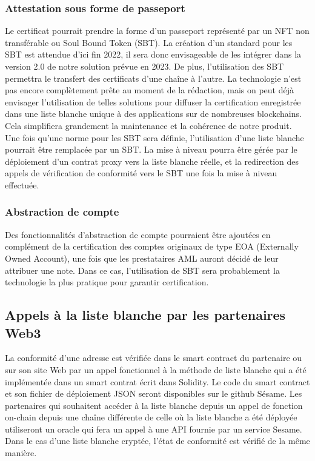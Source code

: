 ﻿\documentclass[a4paper]{article}
\begin{document}
\subsubsection{Attestation sous forme de passeport}
Le certificat pourrait prendre la forme d'un passeport représenté par un NFT non transférable ou Soul Bound Token (SBT). La création d'un standard pour les SBT est attendue d’ici fin 2022, il sera donc envisageable de les intégrer dans la version 2.0 de notre solution prévue en 2023.
De plus, l’utilisation des SBT permettra le transfert des certificats d'une chaîne à l'autre. La technologie n'est pas encore complètement prête au moment de la rédaction, mais on peut déjà envisager l'utilisation de telles solutions pour diffuser la certification enregistrée dans une liste blanche unique à des applications sur de nombreuses blockchains. Cela simplifiera grandement la maintenance et la cohérence de notre produit. \\

Une fois qu'une norme pour les SBT sera définie, l'utilisation d'une liste blanche pourrait être remplacée par un SBT. La mise à niveau pourra être gérée par le déploiement d'un contrat proxy vers la liste blanche réelle, et la redirection des appels de vérification de conformité vers le SBT une fois la mise à niveau effectuée.

\subsubsection{Abstraction de compte}
Des fonctionnalités d'abstraction de compte pourraient être ajoutées en complément de la certification des comptes originaux de type EOA (Externally Owned Account), une fois que les prestataires AML auront décidé de leur attribuer une note. Dans ce cas, l'utilisation de SBT sera probablement la technologie la plus pratique pour garantir certification.

\subsection{Appels à la liste blanche par les partenaires Web3}
La conformité d’une adresse est vérifiée dans le smart contract du partenaire ou sur son site Web par un appel fonctionnel à la méthode de liste blanche qui a été implémentée dans un smart contrat écrit dans Solidity. Le code du smart contract et son fichier de déploiement JSON seront disponibles sur le github Sésame.
Les partenaires qui souhaitent accéder à la liste blanche depuis un appel de fonction on-chain depuis une chaîne différente de celle où la liste blanche a été déployée utiliseront un oracle qui fera un appel à une API fournie par un service Sesame.
Dans le cas d'une liste blanche cryptée, l'état de conformité est vérifié de la même manière.
\end{document}
